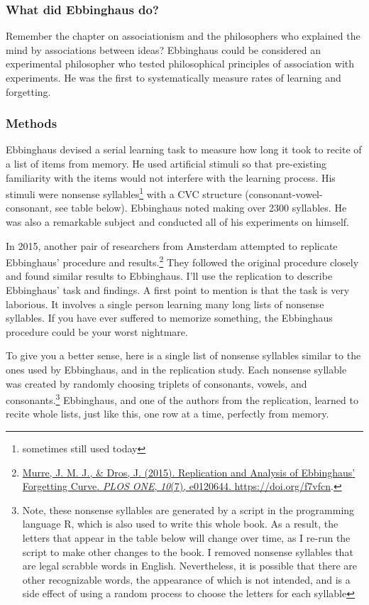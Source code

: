 \documentclass[
  oneside,
  12pt]{crumpbook}
\begin{document}
\hypertarget{what-did-ebbinghaus-do}{%
\subsubsection{What did Ebbinghaus do?}\label{what-did-ebbinghaus-do}}

Remember the chapter on associationism and the philosophers who explained the mind by associations between ideas? Ebbinghaus could be considered an experimental philosopher who tested philosophical principles of association with experiments. He was the first to systematically measure rates of learning and forgetting.

\hypertarget{methods}{%
\subsubsection{Methods}\label{methods}}

Ebbinghaus devised a serial learning task to measure how long it took to recite of a list of items from memory. He used artificial stimuli so that pre-existing familiarity with the items would not interfere with the learning process. His stimuli were nonsense syllables\footnote{sometimes still used today} with a CVC structure (consonant-vowel-consonant, see table below). Ebbinghaus noted making over 2300 syllables. He was also a remarkable subject and conducted all of his experiments on himself.

In 2015, another pair of researchers from Amsterdam attempted to replicate Ebbinghaus' procedure and results.\footnote{\protect\hyperlink{ref-murreReplicationAnalysisEbbinghaus2015}{Murre, J. M. J., \& Dros, J. (2015). Replication and {Analysis} of {Ebbinghaus}' {Forgetting Curve}. \emph{PLOS ONE}, \emph{10}(7), e0120644. \url{https://doi.org/f7vfcn}}.} They followed the original procedure closely and found similar results to Ebbinghaus. I'll use the replication to describe Ebbinghaus' task and findings. A first point to mention is that the task is very laborious. It involves a single person learning many long lists of nonsense syllables. If you have ever suffered to memorize something, the Ebbinghaus procedure could be your worst nightmare.

To give you a better sense, here is a single list of nonsense syllables similar to the ones used by Ebbinghaus, and in the replication study. Each nonsense syllable was created by randomly choosing triplets of consonants, vowels, and consonants.\footnote{Note, these nonsense syllables are generated by a script
  in the programming language R, which is also used to write this
  whole book. As a result, the letters that appear in the table below
  will change over time, as I re-run the script to make other changes
  to the book. I removed nonsense syllables that are legal scrabble
  words in English. Nevertheless, it is possible that there are other
  recognizable words, the appearance of which is not intended, and is
  a side effect of using a random process to choose the letters for
  each syllable} Ebbinghaus, and one of the authors from the replication, learned to recite whole lists, just like this, one row at a time, perfectly from memory.
\end{document}
